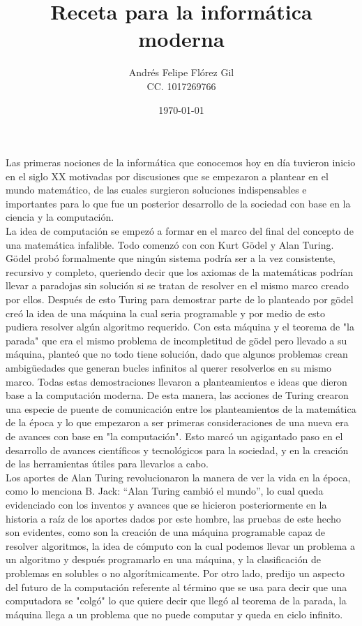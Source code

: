 \documentclass[a4paper]{article}
\title{Receta para la informática moderna}
\author{Andrés Felipe Flórez Gil \\ CC. 1017269766}
\date{\today}
\begin{document}
\maketitle

Las primeras nociones de la informática que conocemos hoy en día tuvieron inicio en el siglo XX motivadas por discusiones que se empezaron a plantear en el mundo matemático, de las cuales surgieron soluciones indispensables e importantes para lo que fue un posterior desarrollo de la sociedad con base en la ciencia y la computación.\\


La idea de computación se empezó  a formar en el marco del final del concepto de una matemática infalible. Todo  comenzó con con  Kurt Gödel y Alan Turing. Gödel probó formalmente que ningún sistema podría ser a la vez consistente, recursivo y completo, queriendo decir que los axiomas de la matemáticas podrían llevar a paradojas sin solución si se tratan de resolver en el mismo marco creado por ellos. Después de esto Turing para demostrar parte de lo planteado por gödel creó la idea de una máquina la cual seria programable y por medio de esto pudiera resolver algún algoritmo requerido. Con esta máquina y el teorema de "la parada" que era el mismo problema de incompletitud de gödel pero llevado a su máquina, planteó que no todo tiene solución, dado que algunos problemas crean ambigüedades que generan bucles infinitos al querer resolverlos en su mismo marco. Todas estas demostraciones llevaron a planteamientos e ideas que dieron base a la computación moderna. De esta manera, las acciones de Turing crearon una especie de puente de comunicación entre los planteamientos de la matemática de la época y lo que empezaron a ser primeras consideraciones de una nueva era de avances con base en "la computación". Esto marcó un agigantado paso en el desarrollo de avances científicos y tecnológicos para la sociedad, y en la creación de las herramientas útiles para llevarlos a cabo.\\ 


Los aportes de Alan Turing revolucionaron la manera de ver la vida en la época, como lo menciona B. Jack: “Alan Turing cambió el mundo”, lo cual queda evidenciado con los inventos y avances que se hicieron posteriormente en la historia a raíz de los aportes dados por este hombre, las pruebas de este hecho son evidentes, como son la creación de una máquina programable capaz de resolver algoritmos, la idea de cómputo con la cual podemos llevar un problema a un algoritmo y después programarlo en una máquina, y la clasificación de problemas en solubles o no algorítmicamente. Por otro lado, predijo un aspecto del futuro de la computación referente al término que se usa para decir que una computadora se "colgó" lo que quiere decir que llegó al teorema de la parada, la máquina llega a un problema que no puede computar y queda en ciclo infinito.\\
\end{document}
